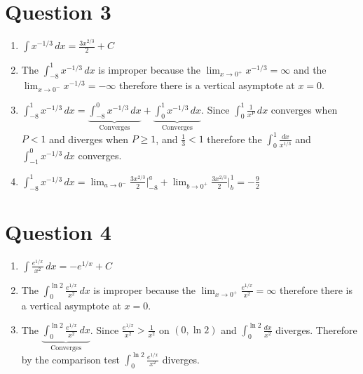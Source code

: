 \documentclass[12pt]{article}
\begin{document}
    \section*{Question 3}
		\begin{enumerate}
			\item  $\int x^{-1/3} \, dx  = \frac{3x^{2/3}}{2} + C $
			\item The $\int_{-8}^{1} x^{-1/3} \, dx $ is improper because the $\lim_{x\to 0^+} x^{-1/3} = \infty$ and the$\lim_{x\to 0^-} x^{-1/3} = -\infty$  therefore there is a vertical asymptote at $x=0$.
			\item \(\int_{-8}^{1} x^{-1/3} \, dx  =\underbrace{\int_{-8}^{0} x^{-1/3} \, dx }_{\text{Converges}} + \underbrace{\int_{0}^{1} x^{-1/3} \, dx}_{\text{Converges}}\). Since $\int_{0}^{1}\frac{1}{x^P} \, dx$ converges when $P < 1$ and diverges when $P \geq 1$, and $\frac{1}{3} < 1$ therefore the $\int_{0}^{1} \frac{dx}{x^{1/3}}$ and $\int_{-1}^{0} x^{-1/3} \, dx $ converges. 
			\item $\int_{-8}^{1} x^{-1/3} \, dx = \lim_{a\to 0^-} \frac{3x^{2/3}}{2} \biggr\rvert_{-8}^{a} + \lim_{b\to 0^+} \frac{3x^{2/3}}{2} \biggr\rvert_{b}^{1} = \boxed{-\frac{9}{2}}$
		\end{enumerate}
    \section*{Question 4}
		\begin{enumerate}
			\item $\int \frac{e^{1/x}}{x^2} \, dx = -e^{1/x} + C$
			\item The $\int_{0}^{\ln 2} \frac{e^{1/x}}{x^2} \, dx $ is improper because the $\lim_{x\to 0^+} \frac{e^{1/x}}{x^2} = \infty$  therefore there is a vertical asymptote at $x=0$.
			\item The $\underbrace{\int_{0}^{\ln 2} \frac{e^{1/x}}{x^2} \, dx}_{\text{Converges}}$. Since \(\frac{e^{1/x}}{x^2} > \frac{1}{x^2}\) on $(0,\ln 2)$ and $\int_{0}^{\ln 2} \frac{dx}{x^2}$ diverges. Therefore by the comparison test $\int_{0}^{\ln 2} \frac{e^{1/x}}{x^2}$ diverges.  
		\end{enumerate}
\end{document}
